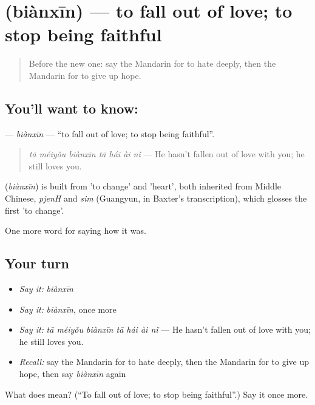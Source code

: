 \section[\texorpdfstring{\zh{变心} (biànxīn)}{变心 (biànxīn)}]{ (biànxīn) — to fall out of love; to stop being faithful}

\label{lesson:ZH-C462-bianxin}



\begin{quote}
Before the new one: say the Mandarin for to hate deeply, then the Mandarin for to give up hope.
\end{quote}

\subsection*{You'll want to know: }
\textbf{} — \emph{biànxīn} — \textquotedblleft{}to fall out of love; to stop being faithful\textquotedblright{}.

\begin{quote}
\textbf{} \emph{tā méiyǒu biànxīn tā hái ài nǐ} — He hasn't fallen out of love with you; he still loves you.
\end{quote}

\begin{cousinweb}
\textbf{} (\emph{biànxīn}) is built from  'to change' and  'heart', both inherited from Middle Chinese, \emph{pjenH} and \emph{sim} (Guangyun, in Baxter's transcription), which glosses the first 'to change'.
\end{cousinweb}

\begin{grammarlens}[title={What you've built}]
One more word for saying how it was.
\end{grammarlens}

\subsection*{Your turn}
\begin{itemize}
\raggedright
  \item \emph{Say it:} \emph{biànxīn}
  \item \emph{Say it:} \emph{biànxīn}, once more
  \item \emph{Say it:} \emph{tā méiyǒu biànxīn tā hái ài nǐ} — He hasn't fallen out of love with you; he still loves you.
  \item \emph{Recall:} say the Mandarin for to hate deeply, then the Mandarin for to give up hope, then say \emph{biànxīn} again
\end{itemize}

\begin{tcolorbox}[breakable,colback=teal!4,colframe=teal!35!black,title={Before you move on}]
What does  mean? (\textquotedblleft{}To fall out of love; to stop being faithful\textquotedblright{}.) Say it once more.
\end{tcolorbox}
